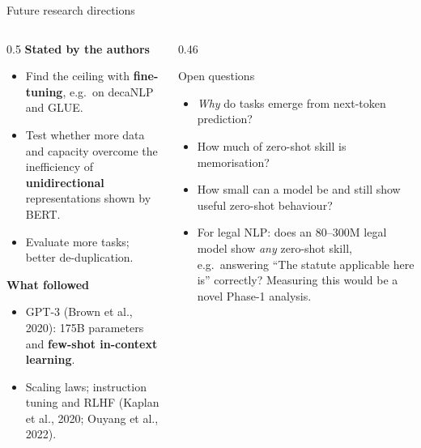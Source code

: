\documentclass[aspectratio=169,11pt]{beamer}
\begin{document}
\begin{frame}{Future research directions}
  \begin{columns}[T]
    \begin{column}{0.5\textwidth}
      \small
      \textbf{Stated by the authors}
      \begin{itemize}
        \item Find the ceiling with \textbf{fine-tuning}, e.g.\ on decaNLP and GLUE.
        \item Test whether more data and capacity overcome the inefficiency of \textbf{unidirectional} representations shown by BERT.
        \item Evaluate more tasks; better de-duplication.
      \end{itemize}
      \textbf{What followed}
      \begin{itemize}
        \item GPT-3 (Brown et al., 2020): 175B parameters and \textbf{few-shot in-context learning}.
        \item Scaling laws; instruction tuning and RLHF (Kaplan et al., 2020; Ouyang et al., 2022).
      \end{itemize}
    \end{column}
    \begin{column}{0.46\textwidth}
      \begin{block}{Open questions}
        \small
        \begin{itemize}
          \item \emph{Why} do tasks emerge from next-token prediction?
          \item How much of zero-shot skill is memorisation?
          \item How small can a model be and still show useful zero-shot behaviour?
          \item For legal NLP: does an 80--300M legal model show \emph{any} zero-shot skill, e.g.\ answering ``The statute applicable here is'' correctly? Measuring this would be a novel Phase-1 analysis.
        \end{itemize}
      \end{block}
    \end{column}
  \end{columns}
\end{frame}
\end{document}
